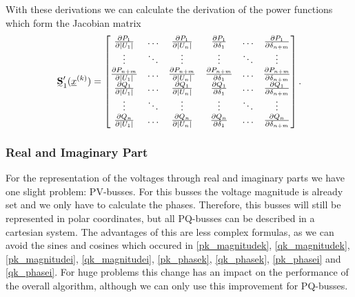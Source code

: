 With these derivations we can calculate the derivation of the power functions which form the Jacobian matrix
\begin{equation}
	\mat S_1' (\vec x^{(k)}) = 
	\begin{bmatrix}
		\frac{\partial P_1}{\partial |U_1|}	& \hdots	& \frac{\partial P_1}{\partial |U_n|}	& \frac{\partial P_1}{\partial \delta_1}	& \hdots	& \frac{\partial P_1}{\partial \delta_{n + m}} \\
		\vdots								& \ddots	& \vdots								& \vdots									& \ddots	& \vdots \\
		\frac{\partial P_{n + m}}{\partial |U_1|}	& \hdots	& \frac{\partial P_{n + m}}{\partial |U_n|}	& \frac{\partial P_{n + m}}{\partial \delta_1}	& \hdots	& \frac{\partial P_{n + m}}{\partial \delta_{n + m}} \\
		\frac{\partial Q_1}{\partial |U_1|}	& \hdots	& \frac{\partial Q_1}{\partial |U_n|}	& \frac{\partial Q_1}{\partial \delta_1}	& \hdots	& \frac{\partial Q_1}{\partial \delta_{n + m}} \\
		\vdots								& \ddots	& \vdots								& \vdots									& \ddots	& \vdots \\
		\frac{\partial Q_n}{\partial |U_1|}	& \hdots	& \frac{\partial Q_n}{\partial |U_n|}	& \frac{\partial Q_n}{\partial \delta_1}	& \hdots	& \frac{\partial Q_n}{\partial \delta_{n + m}}
	\end{bmatrix}.
	\label{eq:power_jacobian_newton_raphson}
\end{equation}

\subsubsection{Real and Imaginary Part}
For the representation of the voltages through real and imaginary parts we have one slight problem: PV-busses. For this busses the voltage magnitude is already set and we only have to calculate the phases. Therefore, this busses will still be represented in polar coordinates, but all PQ-busses can be described in a cartesian system. The advantages of this are less complex formulas, as we can avoid the sines and cosines which occured in \eqref{pk_magnitudek}, \eqref{qk_magnitudek}, \eqref{pk_magnitudei}, \eqref{qk_magnitudei}, \eqref{pk_phasek}, \eqref{qk_phasek}, \eqref{pk_phasei} and \eqref{qk_phasei}. For huge problems this change has an impact on the performance of the overall algorithm, although we can only use this improvement for PQ-busses.

